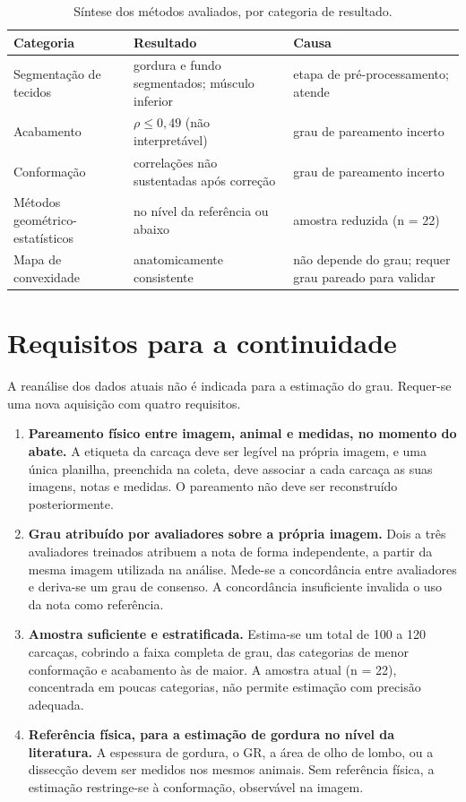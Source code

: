 \documentclass[12pt,a4paper]{article}
\begin{document}
\begin{table}[!ht]
\centering
\caption{Síntese dos métodos avaliados, por categoria de resultado.}
\label{tab:resumo}
\begin{tabular}{p{3.5cm}p{4.5cm}p{4.8cm}}
\toprule
Categoria & Resultado & Causa \\
\midrule
Segmentação de tecidos & gordura e fundo segmentados; músculo inferior & etapa de
pré-processamento; atende \\
Acabamento & $\rho \leq 0{,}49$ (não interpretável) & grau de pareamento incerto \\
Conformação & correlações não sustentadas após correção & grau de pareamento incerto \\
Métodos geométrico-estatísticos & no nível da referência ou abaixo & amostra reduzida
(n = 22) \\
Mapa de convexidade & anatomicamente consistente & não depende do grau; requer grau
pareado para validar \\
\bottomrule
\end{tabular}
\end{table}

\section{Requisitos para a continuidade}

A reanálise dos dados atuais não é indicada para a estimação do grau. Requer-se uma nova
aquisição com quatro requisitos.

\begin{enumerate}[itemsep=0.35em,topsep=0.3em]
\item \textbf{Pareamento físico entre imagem, animal e medidas, no momento do abate.} A
etiqueta da carcaça deve ser legível na própria imagem, e uma única planilha,
preenchida na coleta, deve associar a cada carcaça as suas imagens, notas e medidas. O
pareamento não deve ser reconstruído posteriormente.

\item \textbf{Grau atribuído por avaliadores sobre a própria imagem.} Dois a três
avaliadores treinados atribuem a nota de forma independente, a partir da mesma imagem
utilizada na análise. Mede-se a concordância entre avaliadores e deriva-se um grau de
consenso. A concordância insuficiente invalida o uso da nota como referência.

\item \textbf{Amostra suficiente e estratificada.} Estima-se um total de 100 a 120
carcaças, cobrindo a faixa completa de grau, das categorias de menor conformação e
acabamento às de maior. A amostra atual (n = 22), concentrada em poucas categorias, não
permite estimação com precisão adequada.

\item \textbf{Referência física, para a estimação de gordura no nível da literatura.} A
espessura de gordura, o GR, a área de olho de lombo, ou a dissecção devem ser medidos
nos mesmos animais. Sem referência física, a estimação restringe-se à conformação,
observável na imagem.
\end{enumerate}
\end{document}
